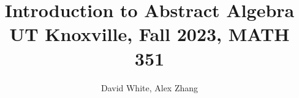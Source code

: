 \documentclass[math]{amznotes}
\title{\textbf{Introduction to Abstract Algebra}\\
\large UT Knoxville, Fall 2023, MATH 351}
\author{David White, Alex Zhang}
\begin{document}
\maketitle
\tableofcontents






\amzindex
\end{document}
